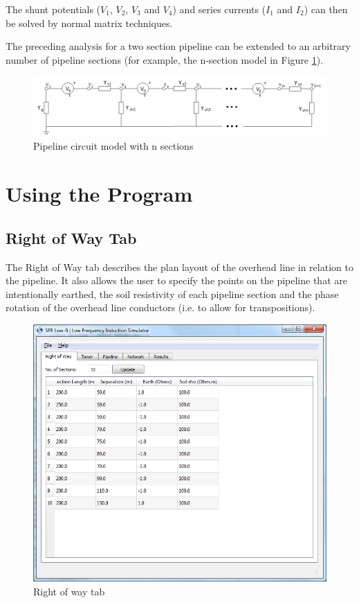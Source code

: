 \documentclass{article}
\begin{document}
The shunt potentials ($V_1$, $V_2$, $V_3$ and $V_4$) and series currents ($I_1$ and $I_2$) can then be solved by normal matrix techniques.

The preceding analysis for a two section pipeline can be extended to an arbitrary number of pipeline sections (for example, the n-section model in Figure \ref{fig:pipeline_model}).

\begin{figure}[!htp]
\begin{center}
\caption{Pipeline circuit model with n sections}
\label{fig:pipeline_model}
\includegraphics[width=\linewidth]{./Figures/pipeline_model.png}
\end{center}
\end{figure}

\newpage
\section{Using the Program}
\subsection{Right of Way Tab}
The Right of Way tab describes the plan layout of the overhead line in relation to the pipeline. It also allows the user to specify the points on the pipeline that are intentionally earthed, the soil resistivity of each pipeline section and the phase rotation of the overhead line conductors (i.e. to allow for transpositions). 

\begin{figure}[!htp]
\begin{center}
\caption{Right of way tab}
\label{fig:right_of_way}
\includegraphics[width=0.9\linewidth]{./Figures/right_of_way.png}
\end{center}
\end{figure}
\end{document}
